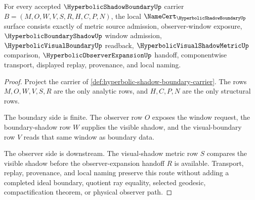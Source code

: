 \begin{theorem}
\label{thm:hyperbolic-shadow-boundary-namecert-obligations}
For every accepted $\HyperbolicShadowBoundaryUp$ carrier $B=(M,O,W,V,S,R,H,C,P,N)$, the local $\NameCert_{\HyperbolicShadowBoundaryUp}$ surface consists exactly of metric source admission, observer-window exposure, $\HyperbolicBoundaryShadowUp$ window admission, $\HyperbolicVisualBoundaryUp$ readback, $\HyperbolicVisualShadowMetricUp$ comparison, $\HyperbolicObserverExpansionUp$ handoff, componentwise transport, displayed replay, provenance, and local naming.
\end{theorem}
\begin{proof}
Project the carrier of \autoref{def:hyperbolic-shadow-boundary-carrier}. The rows $M,O,W,V,S,R$ are the only analytic rows, and $H,C,P,N$ are the only structural rows.

The boundary side is finite. The observer row $O$ exposes the window request, the boundary-shadow row $W$ supplies the visible shadow, and the visual-boundary row $V$ reads that same window as boundary data.

The observer side is downstream. The visual-shadow metric row $S$ compares the visible shadow before the observer-expansion handoff $R$ is available. Transport, replay, provenance, and local naming preserve this route without adding a completed ideal boundary, quotient ray equality, selected geodesic, compactification theorem, or physical observer path.
\end{proof}

